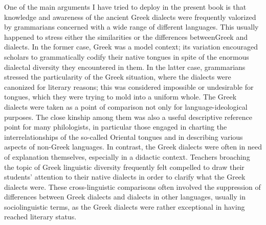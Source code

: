 One of the main arguments I have tried to deploy in the present book is that knowledge and awareness of the ancient Greek dialects were frequently valorized by grammarians concerned with a wide range of different languages. This usually happened to stress either the similarities or the differences between\linebreak Greek and  dialects. In the former case, Greek was a model context; its variation encouraged scholars to grammatically codify their native tongues in spite of the enormous dialectal diversity they encountered in them. In the latter case,  grammarians stressed the particularity of the Greek situation, where the dialects were canonized for literary reasons; this was considered impossible or undesirable for  tongues, which they were trying to mold into a uniform whole. The Greek dialects were taken as a point of comparison not only for language-ideological purposes. The close kinship among them was also a useful descriptive reference point for many philologists, in particular those engaged in charting the interrelationships of the so-called Oriental tongues and in describing various aspects of non-Greek languages. In contrast, the Greek dialects were often in need of explanation themselves, especially in a didactic context. Teachers broaching the topic of Greek linguistic diversity frequently felt compelled to draw their students’ attention to their native dialects in order to clarify what the Greek dialects were. These cross-linguistic comparisons often involved the suppression of differences between Greek dialects and dialects in other languages, usually in sociolinguistic terms, as the Greek dialects were rather exceptional in having reached literary status.


